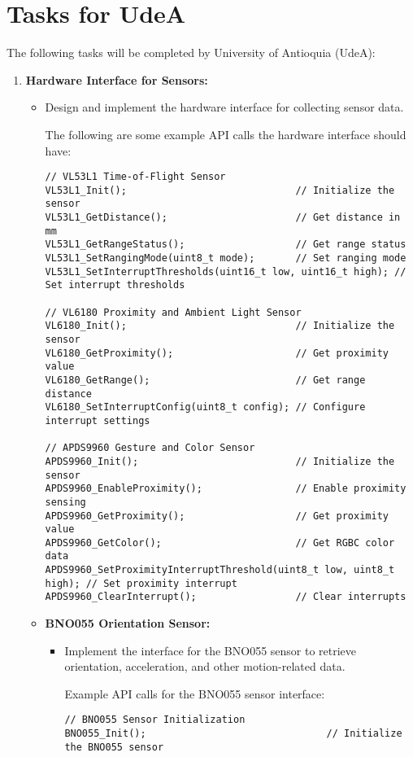 \documentclass[a4paper,9pt]{article}
\begin{document}
\section*{Tasks for UdeA}
The following tasks will be completed by University of Antioquia (UdeA):
\begin{enumerate}
	\item \textbf{Hardware Interface for Sensors:}
	      \begin{itemize}
		      \item Design and implement the hardware interface for collecting sensor data.

		            The following are some example API calls the hardware interface should have:
		            \begin{lstlisting}
// VL53L1 Time-of-Flight Sensor
VL53L1_Init();                             // Initialize the sensor
VL53L1_GetDistance();                      // Get distance in mm
VL53L1_GetRangeStatus();                   // Get range status
VL53L1_SetRangingMode(uint8_t mode);       // Set ranging mode
VL53L1_SetInterruptThresholds(uint16_t low, uint16_t high); // Set interrupt thresholds

// VL6180 Proximity and Ambient Light Sensor
VL6180_Init();                             // Initialize the sensor
VL6180_GetProximity();                     // Get proximity value
VL6180_GetRange();                         // Get range distance
VL6180_SetInterruptConfig(uint8_t config); // Configure interrupt settings

// APDS9960 Gesture and Color Sensor
APDS9960_Init();                           // Initialize the sensor
APDS9960_EnableProximity();                // Enable proximity sensing
APDS9960_GetProximity();                   // Get proximity value
APDS9960_GetColor();                       // Get RGBC color data
APDS9960_SetProximityInterruptThreshold(uint8_t low, uint8_t high); // Set proximity interrupt
APDS9960_ClearInterrupt();                 // Clear interrupts
		            \end{lstlisting}

		      \item \textbf{BNO055 Orientation Sensor:}
		            \begin{itemize}
			            \item Implement the interface for the BNO055 sensor to retrieve orientation, acceleration, and other motion-related data.

			                  Example API calls for the BNO055 sensor interface:
			                  \begin{lstlisting}
// BNO055 Sensor Initialization
BNO055_Init();                               // Initialize the BNO055 sensor


\end{lstlisting}
\end{itemize}
\end{itemize}
\end{enumerate}
\end{document}
